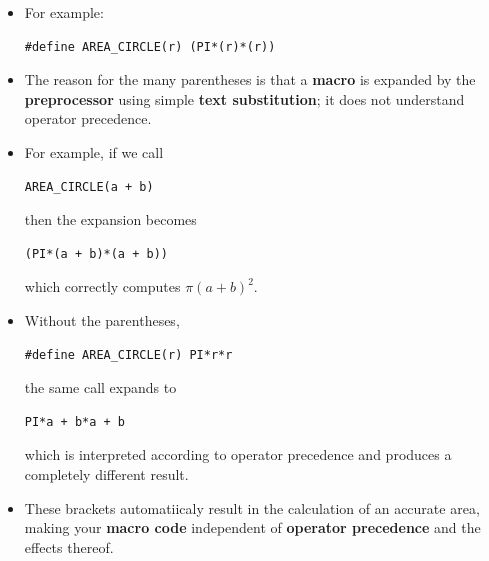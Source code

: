 \documentclass[10pt]{article}
\newcommand{\pbreak}{\vspace{30pt}}
\begin{document}
\begin{itemize}
    \item For example:
\begin{verbatim}
#define AREA_CIRCLE(r) (PI*(r)*(r))
\end{verbatim}

    \item The reason for the many parentheses is that a \textbf{macro} is expanded by the \textbf{preprocessor} using simple \textbf{text substitution}; it does not understand operator precedence.

    \item For example, if we call
\begin{verbatim}
AREA_CIRCLE(a + b)
\end{verbatim}
    then the expansion becomes
\begin{verbatim}
(PI*(a + b)*(a + b))
\end{verbatim}
    which correctly computes $\pi(a+b)^2$.

    \item Without the parentheses,
\begin{verbatim}
#define AREA_CIRCLE(r) PI*r*r
\end{verbatim}
    the same call expands to
\begin{verbatim}
PI*a + b*a + b
\end{verbatim}
    which is interpreted according to operator precedence and produces a completely different result.

	\pbreak

\item These brackets automatiicaly result in the calculation of an accurate area, making your \textbf{macro code} independent of \textbf{operator precedence} and the effects thereof.
\end{itemize}

\newpage
\end{document}
